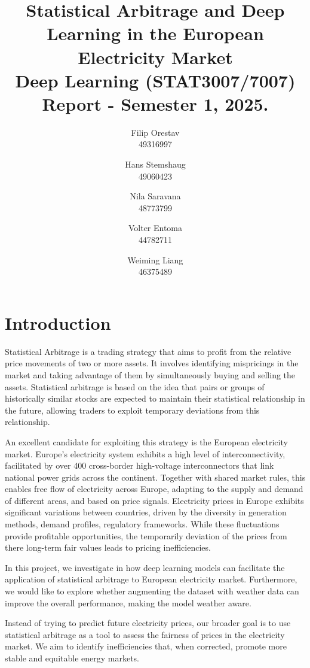 \documentclass[12pt]{article}
\title{Statistical Arbitrage and Deep Learning in the European Electricity Market \\ Deep Learning (STAT3007/7007) \\ Report - Semester 1, 2025.}
\author{\normalsize
    Filip Orestav\\ \normalsize
    49316997
    \and \normalsize
    Hans Stemshaug\\ \normalsize
    49060423
    \and \normalsize
    Nila Saravana\\ \normalsize
    48773799
    \and \normalsize
    Volter Entoma\\ \normalsize
    44782711
    \and \normalsize
    Weiming Liang\\ \normalsize
    46375489
}
\begin{document}
\maketitle




\section{Introduction}

Statistical Arbitrage is a trading strategy that aims to profit from the relative price movements of two or more assets.  It involves identifying mispricings in the market and taking advantage of them by simultaneously buying and selling the assets. Statistical arbitrage is based on the idea that pairs or groups of historically similar stocks are expected to maintain their statistical relationship in the future, allowing traders to exploit temporary deviations from this relationship. \citep{avellaneda2010statistical}

An excellent candidate for exploiting this strategy is the European electricity market. Europe's electricity system exhibits a high level of interconnectivity, facilitated by over 400 cross-border high-voltage interconnectors that link national power grids across the continent. Together with shared market rules, this enables free flow of electricity across Europe, adapting to the supply and demand of different areas, and based on price signals.  Electricity prices in Europe exhibits significant variations between countries, driven by the diversity in generation methods, demand profiles, regulatory frameworks. \citep{ember2023interconnectors} While these fluctuations provide profitable opportunities, the temporarily deviation of the prices from there long-term fair values leads to pricing inefficiencies.

In this project, we investigate in how deep learning models can facilitate the application of statistical arbitrage to European electricity market. Furthermore, we would like to explore whether augmenting the dataset with weather data can improve the overall performance, making the model weather aware. 

Instead of trying to predict future electricity prices, our broader goal is to use statistical arbitrage as a tool to assess the fairness of prices in the electricity market. We aim to identify inefficiencies that, when corrected, promote more stable and equitable energy markets.
\end{document}
